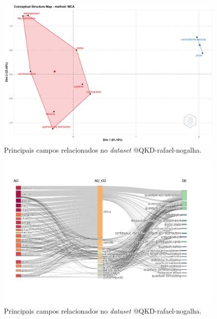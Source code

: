 \begin{figure}[H]
    \centering
    \includegraphics[width=1\textwidth]{experiments/rafaelnogalha/PesquisaBibliografica/QKDSegurancaComputacional/images/mapa-fatorial.png}
    \caption{Principais campos relacionados no \textit{dataset} @QKD-rafael-nogalha.}
    \label{fig:mapa:fatorial:@QKD-rafael-nogalha}
\end{figure}

\begin{figure}[H]
    \centering
    \includegraphics[width=1\textwidth]{experiments/rafaelnogalha/PesquisaBibliografica/QKDSegurancaComputacional/images/three-fields-plot-qkd.png}
    \caption{Principais campos relacionados no \textit{dataset} @QKD-rafael-nogalha.}
    \label{fig:three:plot:@QKD-rafael-nogalha}
\end{figure}

